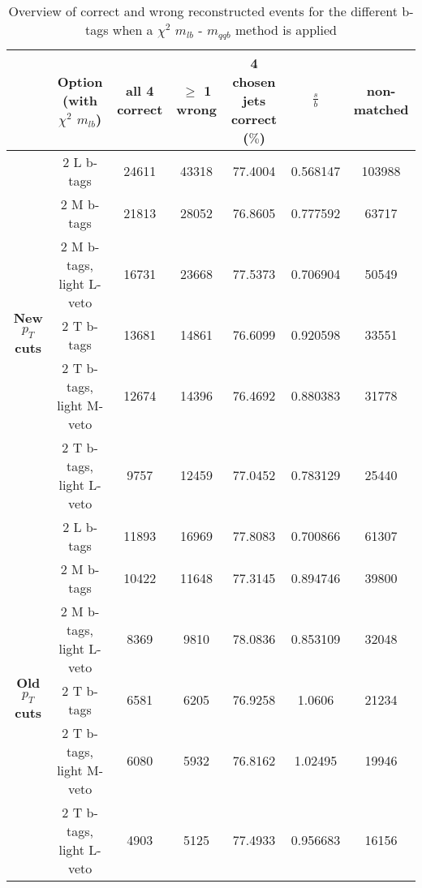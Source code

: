\begin{landscape}
 \begin{table}[!h] 
 \begin{tabular}{c|c|c|c|c|c|c} 
&\textbf{Option} (with $\chi^{2}$ $m_{lb}$) & all 4 correct & $\geq$ 1 wrong & 4 chosen jets correct ($\%$) & $\frac{s}{b}$ & non-matched \\ \hline 
\multirow{6}{*}{\textbf{New $p_T$ cuts}}
& 2 L b-tags              & 24611 & 43318 & 77.4004 & 0.568147 & 103988 \\ 
& 2 M b-tags              & 21813 & 28052 & 76.8605 & 0.777592 & 63717 \\ 
& 2 M b-tags, light L-veto & 16731 & 23668 & 77.5373 & 0.706904 & 50549 \\ 
& 2 T b-tags              & 13681 & 14861 & 76.6099 & 0.920598 & 33551 \\ 
& 2 T b-tags, light M-veto & 12674 & 14396 & 76.4692 & 0.880383 & 31778 \\ 
& 2 T b-tags, light L-veto & 9757 & 12459 & 77.0452 & 0.783129 & 25440 \\ 
\hline
\multirow{6}{*}{\textbf{Old $p_T$ cuts}} 
& 2 L b-tags              & 11893 & 16969 & 77.8083 & 0.700866 & 61307 \\ 
& 2 M b-tags              & 10422 & 11648 & 77.3145 & 0.894746 & 39800 \\ 
& 2 M b-tags, light L-veto & 8369 & 9810 & 78.0836 & 0.853109 & 32048 \\ 
& 2 T b-tags              & 6581 & 6205 & 76.9258 & 1.0606 & 21234 \\ 
& 2 T b-tags, light M-veto & 6080 & 5932 & 76.8162 & 1.02495 & 19946 \\ 
& 2 T b-tags, light L-veto & 4903 & 5125 & 77.4933 & 0.956683 & 16156 \\ 
 \end{tabular} 
 \caption{Overview of correct and wrong reconstructed events for the different b-tags when a $\chi^{2}$ $m_{lb}$ - $m_{qqb}$ method is applied} 
 \end{table} 
 

\end{landscape}
